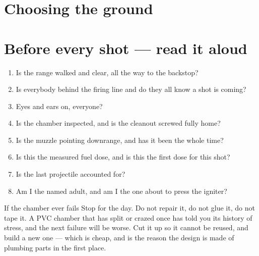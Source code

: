 \section{Choosing the ground}
\begin{telosfacts}[0.20]
\end{telosfacts}

\section{Before every shot --- read it aloud}
\begin{telosframe}
\begin{enumerate}[leftmargin=1.4em,itemsep=0.1em]
\item Is the range walked and clear, all the way to the backstop?
\item Is everybody behind the firing line and do they all know a shot is coming?
\item Eyes and ears on, everyone?
\item Is the chamber inspected, and is the cleanout screwed fully home?
\item Is the muzzle pointing downrange, and has it been the whole time?
\item Is this the measured fuel dose, and is this the first dose for this shot?
\item Is the last projectile accounted for?
\item Am I the named adult, and am I the one about to press the igniter?
\end{enumerate}
\end{telosframe}

\begin{teloshazard}{If the chamber ever fails}
Stop for the day. Do not repair it, do not glue it, do not tape it. A PVC
chamber that has split or crazed once has told you its history of stress, and
the next failure will be worse. Cut it up so it cannot be reused, and build a
new one --- which is cheap, and is the reason the design is made of plumbing
parts in the first place.
\end{teloshazard}

